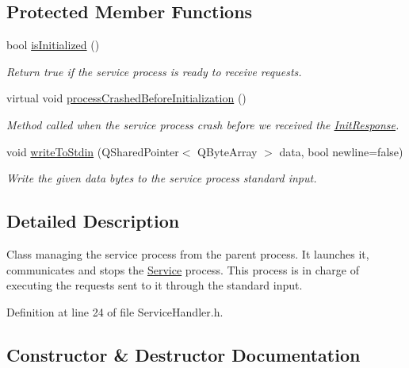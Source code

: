 \subsection*{Protected Member Functions}
\begin{DoxyCompactItemize}
\item 
bool \hyperlink{class_gost_crypt_1_1_core_1_1_service_handler_aaae64d87599cb8ea04563081b9dffe66}{is\+Initialized} ()
\begin{DoxyCompactList}\small\item\em Return true if the service process is ready to receive requests. \end{DoxyCompactList}\item 
virtual void \hyperlink{class_gost_crypt_1_1_core_1_1_service_handler_aa2e50a9702c5d0a01f5d6cda3611d5e8}{process\+Crashed\+Before\+Initialization} ()
\begin{DoxyCompactList}\small\item\em Method called when the service process crash before we received the \hyperlink{struct_gost_crypt_1_1_core_1_1_init_response}{Init\+Response}. \end{DoxyCompactList}\item 
void \hyperlink{class_gost_crypt_1_1_core_1_1_service_handler_ae2fc74c0f1c61adedf4aa122fe2a4336}{write\+To\+Stdin} (Q\+Shared\+Pointer$<$ Q\+Byte\+Array $>$ data, bool newline=false)
\begin{DoxyCompactList}\small\item\em Write the given data bytes to the service process standard input. \end{DoxyCompactList}\end{DoxyCompactItemize}


\subsection{Detailed Description}
Class managing the service process from the parent process. It launches it, communicates and stops the \hyperlink{class_gost_crypt_1_1_core_1_1_service}{Service} process. This process is in charge of executing the requests sent to it through the standard input. 

Definition at line 24 of file Service\+Handler.\+h.



\subsection{Constructor \& Destructor Documentation}
\mbox{\label{class_gost_crypt_1_1_core_1_1_service_handler_af992d088e7f81498f241daddac1975d1}} 
